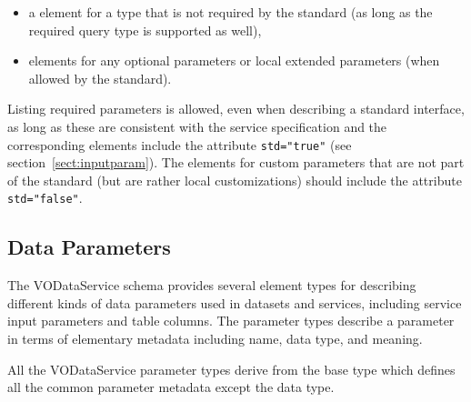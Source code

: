 \documentclass[11pt,a4paper]{ivoa}
\begin{document}
\begin{itemize}
\item a  element for a type that is not
  required by the standard (as long as the required query type is
  supported as well),

\item {}\/ elements for any optional parameters
       or local extended parameters (when allowed by the standard).
\end{itemize}


Listing required parameters is allowed, even when
describing a standard interface, as long as these are consistent with
the service specification and the corresponding 
elements include the attribute \verb|std="true"| (see
section~\ref{sect:inputparam}).  The 
elements for custom parameters that are not part of the standard (but
are rather local customizations) should include the attribute
\verb|std="false"|.





\subsection{Data Parameters}
\label{sect:param}


The VODataService schema provides several element types for describing
different kinds of data parameters used in datasets and services,
including service input parameters and table columns.  The parameter
types describe a parameter in terms of elementary metadata
including name, data type, and meaning.


All the VODataService parameter types derive from the base type
 which defines all the common parameter
metadata except the data type.
\end{document}
